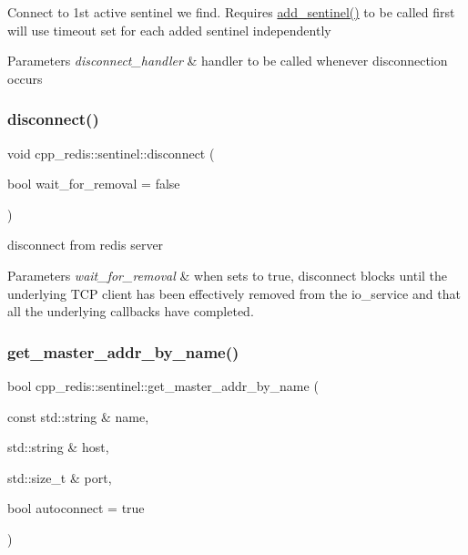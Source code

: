 Connect to 1st active sentinel we find. Requires \mbox{\hyperlink{classcpp__redis_1_1sentinel_a6c846b71478c330d2cad7aa662dfd681}{add\+\_\+sentinel()}} to be called first will use timeout set for each added sentinel independently


\begin{DoxyParams}{Parameters}
{\em disconnect\+\_\+handler} & handler to be called whenever disconnection occurs \\
\hline
\end{DoxyParams}
\mbox{\label{classcpp__redis_1_1sentinel_af607d8c5a20ada35daad251f1b1b2f68}} 
\subsubsection{\texorpdfstring{disconnect()}{disconnect()}}
{\footnotesize\ttfamily void cpp\+\_\+redis\+::sentinel\+::disconnect (\begin{DoxyParamCaption}\item[{bool}]{wait\+\_\+for\+\_\+removal = {\ttfamily false} }\end{DoxyParamCaption})}

disconnect from redis server


\begin{DoxyParams}{Parameters}
{\em wait\+\_\+for\+\_\+removal} & when sets to true, disconnect blocks until the underlying T\+CP client has been effectively removed from the io\+\_\+service and that all the underlying callbacks have completed. \\
\hline
\end{DoxyParams}
\mbox{\label{classcpp__redis_1_1sentinel_a2886493b40b00dfafdd3b22dfe28e0c3}} 
\subsubsection{\texorpdfstring{get\+\_\+master\+\_\+addr\+\_\+by\+\_\+name()}{get\_master\_addr\_by\_name()}}
{\footnotesize\ttfamily bool cpp\+\_\+redis\+::sentinel\+::get\+\_\+master\+\_\+addr\+\_\+by\+\_\+name (\begin{DoxyParamCaption}\item[{const std\+::string \&}]{name,  }\item[{std\+::string \&}]{host,  }\item[{std\+::size\+\_\+t \&}]{port,  }\item[{bool}]{autoconnect = {\ttfamily true} }\end{DoxyParamCaption})}

